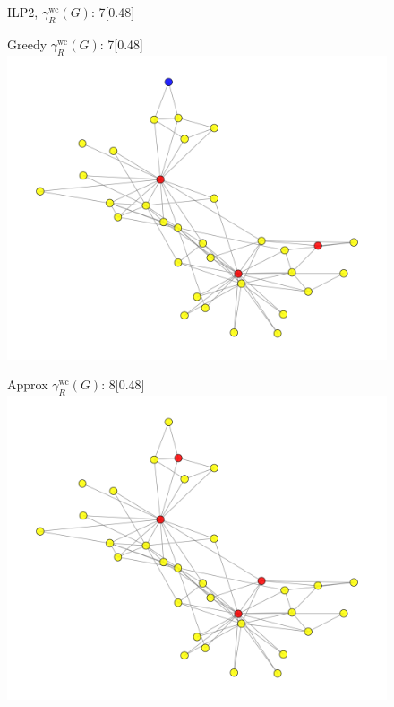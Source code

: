 \begin{figure}[htbp]
\begin{subcaptionbox}{ILP2,  $\gamma^{\text{wc}}_R(G)$: 7\label{fig:ilp2}}[0.48\linewidth]
    \end{subcaptionbox}
    \hfill
    \begin{subcaptionbox}{Greedy  $\gamma^{\text{wc}}_R(G)$: 7\label{fig:greedy}}[0.48\linewidth]
        {\includegraphics[width=\linewidth]{assets/Facebook/greedy.png}}
    \end{subcaptionbox}
    \hfill
    \begin{subcaptionbox}{Approx  $\gamma^{\text{wc}}_R(G)$: 8\label{fig:approx}}[0.48\linewidth]
        {\includegraphics[width=\linewidth]{assets/Facebook/approx.png}}
    \end{subcaptionbox}

\end{figure}
